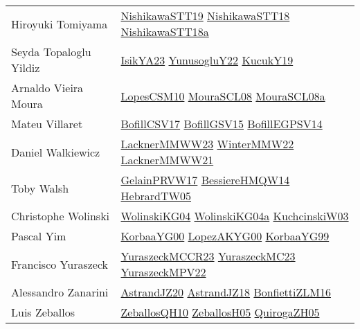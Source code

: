 {\begin{longtable}{p{4cm}p{20cm}}
Hiroyuki Tomiyama & \href{}{NishikawaSTT19}\cite{NishikawaSTT19} \href{papers/NishikawaSTT18.pdf}{NishikawaSTT18}\cite{NishikawaSTT18} \href{papers/NishikawaSTT18a.pdf}{NishikawaSTT18a}\cite{NishikawaSTT18a} \\
Seyda Topaloglu Yildiz & \href{articles/IsikYA23.pdf}{IsikYA23}\cite{IsikYA23} \href{}{YunusogluY22}\cite{YunusogluY22} \href{}{KucukY19}\cite{KucukY19} \\
Arnaldo Vieira Moura & \href{articles/LopesCSM10.pdf}{LopesCSM10}\cite{LopesCSM10} \href{papers/MouraSCL08.pdf}{MouraSCL08}\cite{MouraSCL08} \href{papers/MouraSCL08a.pdf}{MouraSCL08a}\cite{MouraSCL08a} \\
Mateu Villaret & \href{papers/BofillCSV17.pdf}{BofillCSV17}\cite{BofillCSV17} \href{papers/BofillGSV15.pdf}{BofillGSV15}\cite{BofillGSV15} \href{papers/BofillEGPSV14.pdf}{BofillEGPSV14}\cite{BofillEGPSV14} \\
Daniel Walkiewicz & \href{articles/LacknerMMWW23.pdf}{LacknerMMWW23}\cite{LacknerMMWW23} \href{papers/WinterMMW22.pdf}{WinterMMW22}\cite{WinterMMW22} \href{papers/LacknerMMWW21.pdf}{LacknerMMWW21}\cite{LacknerMMWW21} \\
Toby Walsh & \href{papers/GelainPRVW17.pdf}{GelainPRVW17}\cite{GelainPRVW17} \href{papers/BessiereHMQW14.pdf}{BessiereHMQW14}\cite{BessiereHMQW14} \href{papers/HebrardTW05.pdf}{HebrardTW05}\cite{HebrardTW05} \\
Christophe Wolinski & \href{papers/WolinskiKG04.pdf}{WolinskiKG04}\cite{WolinskiKG04} \href{}{WolinskiKG04a}\cite{WolinskiKG04a} \href{articles/KuchcinskiW03.pdf}{KuchcinskiW03}\cite{KuchcinskiW03} \\
Pascal Yim & \href{articles/KorbaaYG00.pdf}{KorbaaYG00}\cite{KorbaaYG00} \href{articles/LopezAKYG00.pdf}{LopezAKYG00}\cite{LopezAKYG00} \href{papers/KorbaaYG99.pdf}{KorbaaYG99}\cite{KorbaaYG99} \\
Francisco Yuraszeck & \href{articles/YuraszeckMCCR23.pdf}{YuraszeckMCCR23}\cite{YuraszeckMCCR23} \href{papers/YuraszeckMC23.pdf}{YuraszeckMC23}\cite{YuraszeckMC23} \href{articles/YuraszeckMPV22.pdf}{YuraszeckMPV22}\cite{YuraszeckMPV22} \\
Alessandro Zanarini & \href{articles/AstrandJZ20.pdf}{AstrandJZ20}\cite{AstrandJZ20} \href{papers/AstrandJZ18.pdf}{AstrandJZ18}\cite{AstrandJZ18} \href{papers/BonfiettiZLM16.pdf}{BonfiettiZLM16}\cite{BonfiettiZLM16} \\
Luis Zeballos & \href{articles/ZeballosQH10.pdf}{ZeballosQH10}\cite{ZeballosQH10} \href{articles/ZeballosH05.pdf}{ZeballosH05}\cite{ZeballosH05} \href{papers/QuirogaZH05.pdf}{QuirogaZH05}\cite{QuirogaZH05} \\

\end{longtable}}
